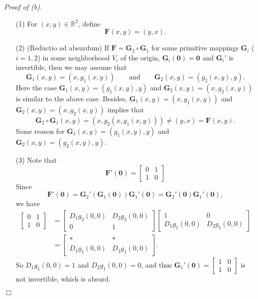 \documentclass{article}
\begin{document}
\emph{Proof of (b).}
\begin{enumerate}
\item[(1)]
  For $(x,y) \in \mathbb{R}^2$, define
  \[
    \mathbf{F}(x,y) = (y,x).
  \]

\item[(2)]
  (Reductio ad absurdum)
  If $\mathbf{F} = \mathbf{G}_2 \circ \mathbf{G}_1$ for some primitive mappings
  $\mathbf{G}_{i}$ ($i = 1,2$) in some neighborhood $V_{i}$ of the origin,
  $\mathbf{G}_{i}(\mathbf{0}) = \mathbf{0}$ and $\mathbf{G}_{i}'$ is invertible,
  then we may assume that
  \[
    \mathbf{G}_1(x,y) = (x, g_1(x,y))
    \qquad
    \text{and}
    \qquad
    \mathbf{G}_2(x,y) = (g_2(x,y),y).
  \]
  Here the case $\mathbf{G}_1(x,y) = (g_1(x,y),y)$ and $\mathbf{G}_2(x,y) = (x,g_2(x,y))$
  is similar to the above case.
  Besides, $\mathbf{G}_1(x,y) = (x,g_1(x,y))$ and $\mathbf{G}_2(x,y) = (x,g_2(x,y))$
  implies that
  \[
    \mathbf{G}_2 \circ \mathbf{G}_1(x,y) = (x,g_2(x,g_1(x,y)))
    \neq (y,x) = \mathbf{F}(x,y).
  \]
  Same reason for
  $\mathbf{G}_1(x,y) = (g_1(x,y),y)$ and $\mathbf{G}_2(x,y) = (g_2(x,y),y)$.

\item[(3)]
  Note that
  \[
    \mathbf{F}'(\mathbf{0})
    =
    \begin{bmatrix}
      0 & 1 \\
      1 & 0
    \end{bmatrix}
  \]
  Since
  \[
    \mathbf{F}'(\mathbf{0})
    = \mathbf{G}_2'(\mathbf{G}_1(\mathbf{0})) \mathbf{G}_1'(\mathbf{0})
    = \mathbf{G}_2'(\mathbf{0}) \mathbf{G}_1'(\mathbf{0}),
  \]
  we have
  \begin{align*}
    \begin{bmatrix}
      0 & 1 \\
      1 & 0
    \end{bmatrix}
    &=
    \begin{bmatrix}
      D_1 g_2(0,0) & D_2 g_2(0,0) \\
      0 & 1
    \end{bmatrix}
    \begin{bmatrix}
      1 & 0 \\
      D_1 g_1(0,0) & D_2 g_1(0,0)
    \end{bmatrix} \\
    &=
    \begin{bmatrix}
      * & * \\
      D_1 g_1(0,0) & D_2 g_1(0,0)
    \end{bmatrix}.
  \end{align*}
  So $D_1 g_1(0,0) = 1$ and $D_2 g_1(0,0) = 0$, and thus
  $\mathbf{G}_1'(\mathbf{0})
  =
  \begin{bmatrix}
    1 & 0 \\
    1 & 0
  \end{bmatrix}$
  is not invertible, which is absurd.


\end{enumerate}
$\Box$ \\\\
\end{document}
